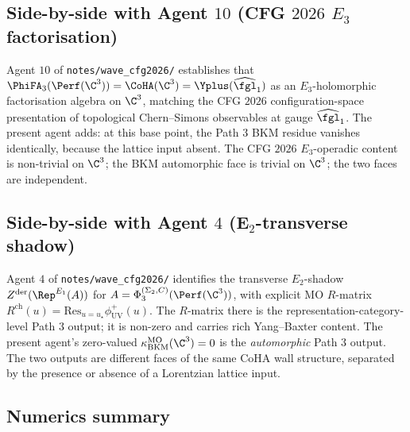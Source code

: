 \subsection*{Side-by-side with Agent $10$ (CFG $2026$ $E_3$ factorisation)}

Agent $10$ of \texttt{notes/wave\_cfg2026/} establishes that
$\PhiFA_3(\Perf(\C^3)) = \CoHA(\C^3) = \Yplus(\widehat{\fgl}_1)$
as an $E_3$-holomorphic factorisation algebra on $\C^3$, matching the
CFG $2026$ configuration-space presentation of topological
Chern--Simons observables at gauge $\widehat{\fgl}_1$. The present
agent adds: at this base point, the Path 3 BKM residue vanishes
identically, because the lattice input absent. The CFG $2026$
$E_3$-operadic content is non-trivial on $\C^3$; the BKM
automorphic face is trivial on $\C^3$; the two faces are
independent.

\subsection*{Side-by-side with Agent $4$ (E${}_2$-transverse shadow)}

Agent $4$ of \texttt{notes/wave\_cfg2026/} identifies the
transverse $E_2$-shadow $Z^{\mathrm{der}}(\Rep^{E_1}(A))$ for
$A = \Phi_3^{(\Sigma_2, C)}(\Perf(\C^3))$, with explicit MO
$R$-matrix $R^{\mathrm{ch}}(u) = \mathrm{Res}_{u = u_\star}
\phi^+_{\mathrm{UV}}(u)$. The $R$-matrix there is the
representation-category-level Path 3 output; it is non-zero and
carries rich Yang--Baxter content. The present agent's
zero-valued $\kappa_{\mathrm{BKM}}^{\mathrm{MO}}(\C^3) = 0$ is the
\emph{automorphic} Path 3 output. The two outputs are different
faces of the same CoHA wall structure, separated by the presence
or absence of a Lorentzian lattice input.

\subsection*{Numerics summary}

